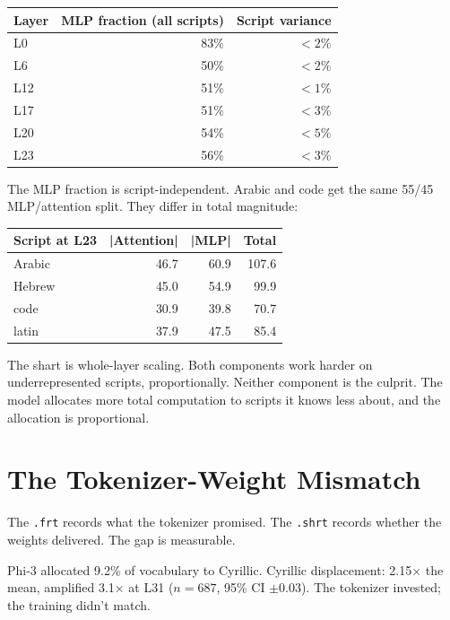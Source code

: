 \documentclass[11pt,a4paper]{article}
\begin{document}
\begin{center}
\begin{tabular}{lrr}
\toprule
\textbf{Layer} & \textbf{MLP fraction (all scripts)} & \textbf{Script variance} \\
\midrule
L0 & 83\% & $< 2\%$ \\
L6 & 50\% & $< 2\%$ \\
L12 & 51\% & $< 1\%$ \\
L17 & 51\% & $< 3\%$ \\
L20 & 54\% & $< 5\%$ \\
L23 & 56\% & $< 3\%$ \\
\bottomrule
\end{tabular}
\end{center}

The MLP fraction is script-independent. Arabic and code get the same 55/45 MLP/attention split. They differ in total magnitude:

\begin{center}
\begin{tabular}{lrrr}
\toprule
\textbf{Script at L23} & \textbf{|Attention|} & \textbf{|MLP|} & \textbf{Total} \\
\midrule
Arabic & 46.7 & 60.9 & 107.6 \\
Hebrew & 45.0 & 54.9 & 99.9 \\
code & 30.9 & 39.8 & 70.7 \\
latin & 37.9 & 47.5 & 85.4 \\
\bottomrule
\end{tabular}
\end{center}

The shart is whole-layer scaling. Both components work harder on underrepresented scripts, proportionally. Neither component is the culprit. The model allocates more total computation to scripts it knows less about, and the allocation is proportional.

\section{The Tokenizer-Weight Mismatch}

The \texttt{.frt} records what the tokenizer promised. The \texttt{.shrt} records whether the weights delivered. The gap is measurable.

Phi-3 allocated 9.2\% of vocabulary to Cyrillic. Cyrillic displacement: 2.15$\times$ the mean, amplified 3.1$\times$ at L31 ($n = 687$, 95\% CI $\pm 0.03$). The tokenizer invested; the training didn't match.
\end{document}
